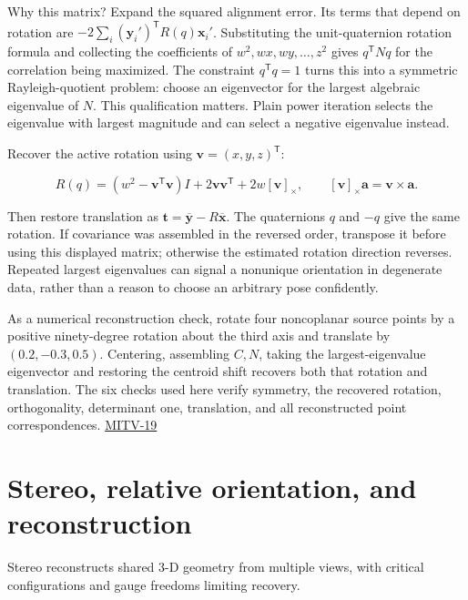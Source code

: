 Why this matrix? Expand the squared alignment error. Its terms that depend on rotation are \(-2\sum_i(\mathbf y_i')^{\mathsf T}R(q)\mathbf x_i'\). Substituting the unit-quaternion rotation formula and collecting the coefficients of \(w^2,wx,wy,\ldots,z^2\) gives \(q^{\mathsf T}Nq\) for the correlation being maximized. The constraint \(q^{\mathsf T}q=1\) turns this into a symmetric Rayleigh-quotient problem: choose an eigenvector for the largest algebraic eigenvalue of \(N\). This qualification matters. Plain power iteration selects the eigenvalue with largest magnitude and can select a negative eigenvalue instead.

Recover the active rotation using \(\mathbf v=(x,y,z)^{\mathsf T}\):

\[
R(q)=(w^2-\mathbf v^{\mathsf T}\mathbf v)I+2\mathbf v\mathbf v^{\mathsf T}+2w[\mathbf v]_\times,
\qquad [\mathbf v]_\times\mathbf a=\mathbf v\times\mathbf a.
\]

Then restore translation as \(\mathbf t=\overline{\mathbf y}-R\overline{\mathbf x}\). The quaternions \(q\) and \(-q\) give the same rotation. If covariance was assembled in the reversed order, transpose it before using this displayed matrix; otherwise the estimated rotation direction reverses. Repeated largest eigenvalues can signal a nonunique orientation in degenerate data, rather than a reason to choose an arbitrary pose confidently.

As a numerical reconstruction check, rotate four noncoplanar source points by a positive ninety-degree rotation about the third axis and translate by \((0.2,-0.3,0.5)\). Centering, assembling \(C,N\), taking the largest-eigenvalue eigenvector and restoring the centroid shift recovers both that rotation and translation. The six checks used here verify symmetry, the recovered rotation, orthogonality, determinant one, translation, and all reconstructed point correspondences. \hyperref[04-visual-computing-ii-ch036-mitv-19---absolute-orientation-in-closed-form-outliers-and-robustness-ransac]{MITV-19}

\section{Stereo, relative orientation, and reconstruction}\label{04-visual-computing-ii-ch032-stereo-relative-orientation-and-reconstruction}

\hypertarget{04-visual-computing-ii-ch032-stereo-relative-orientation-and-reconstruction}{}

Stereo reconstructs shared 3-D geometry from multiple views, with critical configurations and gauge freedoms limiting recovery.

